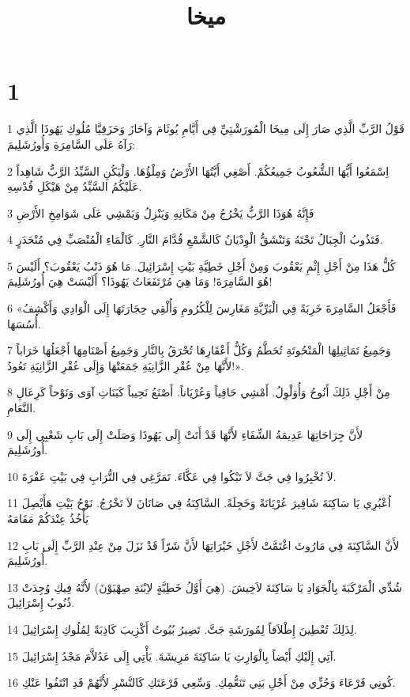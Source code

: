 

\title{ميخا}


\chapter{1}

\par 1 قَوْلُ الرَّبِّ الَّذِي صَارَ إِلَى مِيخَا الْمُورَشْتِيِّ فِي أَيَّامِ يُوثَامَ وَآحَازَ وَحَزَقِيَّا مُلُوكِ يَهُوذَا الَّذِي رَآهُ عَلَى السَّامِرَةِ وَأُورُشَلِيمَ:
\par 2 اِسْمَعُوا أَيُّهَا الشُّعُوبُ جَمِيعُكُمْ. أَصْغِي أَيَّتُهَا الأَرْضُ وَمِلْؤُهَا. وَلْيَكُنِ السَّيِّدُ الرَّبُّ شَاهِداً عَلَيْكُمُ السَّيِّدُ مِنْ هَيْكَلِ قُدْسِهِ.
\par 3 فَإِنَّهُ هُوَذَا الرَّبُّ يَخْرُجُ مِنْ مَكَانِهِ وَيَنْزِلُ وَيَمْشِي عَلَى شَوَامِخِ الأَرْضِ
\par 4 فَتَذُوبُ الْجِبَالُ تَحْتَهُ وَتَنْشَقُّ الْوِدْيَانُ كَالشَّمْعِ قُدَّامَ النَّارِ. كَالْمَاءِ الْمُنْصَبِّ فِي مُنْحَدَرٍ.
\par 5 كُلُّ هَذَا مِنْ أَجْلِ إِثْمِ يَعْقُوبَ وَمِنْ أَجْلِ خَطِيَّةِ بَيْتِ إِسْرَائِيلَ. مَا هُوَ ذَنْبُ يَعْقُوبَ؟ أَلَيْسَ هُوَ السَّامِرَةَ! وَمَا هِيَ مُرْتَفَعَاتُ يَهُوذَا؟ أَلَيْسَتْ هِيَ أُورُشَلِيمَ!
\par 6 «فَأَجْعَلُ السَّامِرَةَ خَرِبَةً فِي الْبَرِّيَّةِ مَغَارِسَ لِلْكُرُومِ وَأُلْقِي حِجَارَتَهَا إِلَى الْوَادِي وَأَكْشِفُ أُسُسَهَا.
\par 7 وَجَمِيعُ تَمَاثِيلِهَا الْمَنْحُوتَةِ تُحَطَّمُ وَكُلُّ أَعْقَارِهَا تُحْرَقُ بِالنَّارِ وَجَمِيعُ أَصْنَامِهَا أَجْعَلُهَا خَرَاباً لأَنَّهَا مِنْ عُقْرِ الزَّانِيَةِ جَمَعَتْهَا وَإِلَى عُقْرِ الزَّانِيَةِ تَعُودُ!».
\par 8 مِنْ أَجْلِ ذَلِكَ أَنُوحُ وَأُوَلْوِلُ. أَمْشِي حَافِياً وَعُرْيَاناً. أَصْنَعُ نَحِيباً كَبَنَاتِ آوَى وَنَوْحاً كَرِعَالِ النَّعَامِ.
\par 9 لأَنَّ جِرَاحَاتِهَا عَدِيمَةُ الشِّفَاءِ لأَنَّهَا قَدْ أَتَتْ إِلَى يَهُوذَا وَصَلَتْ إِلَى بَابِ شَعْبِي إِلَى أُورُشَلِيمَ.
\par 10 لاَ تُخْبِرُوا فِي جَتَّ لاَ تَبْكُوا فِي عَكَّاءَ. تَمَرَّغِي فِي التُّرَابِ فِي بَيْتِ عَفْرَةَ.
\par 11 اُعْبُرِي يَا سَاكِنَةَ شَافِيرَ عُرْيَانَةً وَخَجِلَةً. السَّاكِنَةُ فِي صَانَانَ لاَ تَخْرُجُ. نَوْحُ بَيْتِ هَأَيْصِلَ يَأْخُذُ عِنْدَكُمْ مَقَامَهُ
\par 12 لأَنَّ السَّاكِنَةَ فِي مَارُوثَ اغْتَمَّتْ لأَجْلِ خَيْرَاتِهَا لأَنَّ شَرّاً قَدْ نَزَلَ مِنْ عِنْدِ الرَّبِّ إِلَى بَابِ أُورُشَلِيمَ.
\par 13 شُدِّي الْمَرْكَبَةَ بِالْجَوَادِ يَا سَاكِنَةَ لاَخِيشَ. (هِيَ أَوَّلُ خَطِيَّةٍ لاِبْنَةِ صِهْيَوْنَ) لأَنَّهُ فِيكِ وُجِدَتْ ذُنُوبُ إِسْرَائِيلَ.
\par 14 لِذَلِكَ تُعْطِينَ إِطْلاَقاً لِمُورَشَةِ جَتَّ. تَصِيرُ بُيُوتُ أَكْزِيبَ كَاذِبَةً لِمُلُوكِ إِسْرَائِيلَ.
\par 15 آتِي إِلَيْكِ أَيْضاً بِالْوَارِثِ يَا سَاكِنَةَ مَرِيشَةَ. يَأْتِي إِلَى عَدُلاَّمَ مَجْدُ إِسْرَائِيلَ.
\par 16 كُونِي قَرْعَاءَ وَجُزِّي مِنْ أَجْلِ بَنِي تَنَعُّمِكِ. وَسِّعِي قَرْعَتَكِ كَالنَّسْرِ لأَنَّهُمْ قَدِ انْتَفُوا عَنْكِ.

